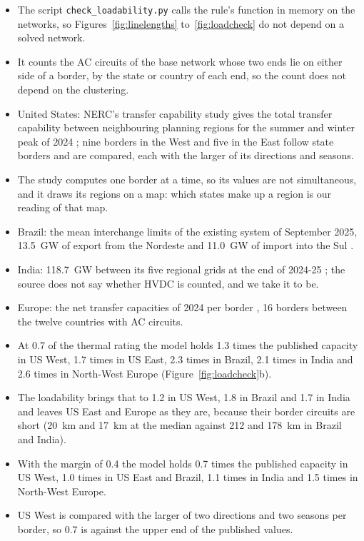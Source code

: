 \begin{itemize}[nosep,leftmargin=*]
  \item The script \texttt{check\_loadability.py} calls the rule's function in memory on the networks, so Figures~\ref{fig:linelengths} to~\ref{fig:loadcheck} do not depend on a solved network.
  \item It counts the AC circuits of the base network whose two ends lie on either side of a border, by the state or country of each end, so the count does not depend on the clustering.
  \item United States: NERC's transfer capability study gives the total transfer capability between neighbouring planning regions for the summer and winter peak of 2024 \citep{nercitcs2024}; nine borders in the West and five in the East follow state borders and are compared, each with the larger of its directions and seasons.
  \item The study computes one border at a time, so its values are not simultaneous, and it draws its regions on a map: which states make up a region is our reading of that map.
  \item Brazil: the mean interchange limits of the existing system of September 2025, \SI{13.5}{GW} of export from the Nordeste and \SI{11.0}{GW} of import into the Sul \citep{epepde2035}.
  \item India: \SI{118.7}{GW} between its five regional grids at the end of 2024-25 \citep{powerline2025}; the source does not say whether HVDC is counted, and we take it to be.
  \item Europe: the net transfer capacities of 2024 per border \citep{emberinterconnection}, 16 borders between the twelve countries with AC circuits.
  \item At 0.7 of the thermal rating the model holds 1.3 times the published capacity in US West, 1.7 times in US East, 2.3 times in Brazil, 2.1 times in India and 2.6 times in North-West Europe (Figure~\ref{fig:loadcheck}b).
  \item The loadability brings that to 1.2 in US West, 1.8 in Brazil and 1.7 in India and leaves US East and Europe as they are, because their border circuits are short (\SI{20}{km} and \SI{17}{km} at the median against 212 and \SI{178}{km} in Brazil and India).
  \item With the margin of 0.4 the model holds 0.7 times the published capacity in US West, 1.0 times in US East and Brazil, 1.1 times in India and 1.5 times in North-West Europe.
  \item US West is compared with the larger of two directions and two seasons per border, so 0.7 is against the upper end of the published values.

\end{itemize}
